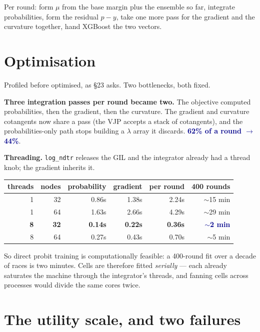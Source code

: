 \documentclass[11pt,a4paper]{article}
\newcommand{\good}[1]{\textcolor{darkblue}{\textbf{#1}}}
\begin{document}
Per round: form $\mu$ from the base margin plus the ensemble so far, integrate probabilities,
form the residual $p-y$, take one more pass for the gradient and the curvature together, hand
XGBoost the two vectors.

\section{Optimisation}

Profiled before optimised, as §23 asks. Two bottlenecks, both fixed.

\textbf{Three integration passes per round became two.} The objective computed probabilities,
then the gradient, then the curvature. The gradient and curvature cotangents now share a pass
(the VJP accepts a stack of cotangents), and the probabilities-only path stops building a
$\lambda$ array it discards. \good{62\% of a round $\to$ 44\%}.

\textbf{Threading.} \texttt{log\_ndtr} releases the GIL and the integrator already had a thread
knob; the gradient inherits it.

\begin{center}\small
\begin{tabular}{rrrrrr}
\toprule
threads & nodes & probability & gradient & per round & 400 rounds \\
\midrule
1 & 32 & 0.86s & 1.38s & 2.24s & $\sim$15 min \\
1 & 64 & 1.63s & 2.66s & 4.29s & $\sim$29 min \\
\rowcolor{rowshade}\textbf{8} & \textbf{32} & \textbf{0.14s} & \textbf{0.22s} & \textbf{0.36s} & \good{$\sim$2 min} \\
8 & 64 & 0.27s & 0.43s & 0.70s & $\sim$5 min \\
\bottomrule
\end{tabular}
\end{center}

So direct probit training is computationally feasible: a 400-round fit over a decade of races is
two minutes. Cells are therefore fitted \emph{serially} --- each already saturates the machine
through the integrator's threads, and fanning cells across processes would divide the same cores
twice.

\section{The utility scale, and two failures}
\end{document}
